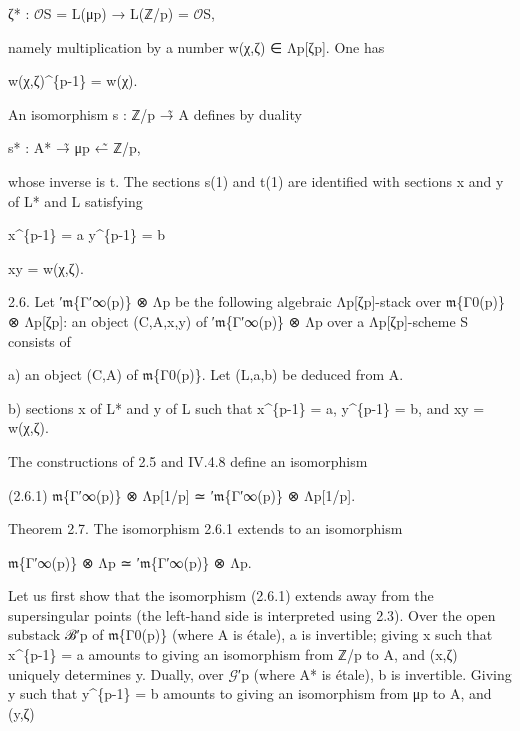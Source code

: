 \documentclass[11pt,a4paper]{article}
\begin{document}
ζ* : \ensuremath{\mathcal{O}}\textunderscore{}S = L(μ\textunderscore{}p) → L(ℤ/p) = \ensuremath{\mathcal{O}}\textunderscore{}S,

namely multiplication by a number w(χ,ζ) ∈ Λ\textunderscore{}p[ζ\textunderscore{}p]. One has

w(χ,ζ)\textasciicircum{}\{p-1\} = w(χ).

An isomorphism s : ℤ/p →̃ A defines by duality

s* : A* →̃ μ\textunderscore{}p ←̃ ℤ/p,

whose inverse is t. The sections s(1) and t(1) are identified with sections x and y of L* and L satisfying

x\textasciicircum{}\{p-1\} = a        y\textasciicircum{}\{p-1\} = b

xy = w(χ,ζ).

2.6. Let ′\ensuremath{\mathfrak{m}}\textunderscore{}\{Γ′\textunderscore{}∞(p)\} ⊗ Λ\textunderscore{}p be the following algebraic Λ\textunderscore{}p[ζ\textunderscore{}p]-stack over \ensuremath{\mathfrak{m}}\textunderscore{}\{Γ\textunderscore{}0(p)\} ⊗ Λ\textunderscore{}p[ζ\textunderscore{}p]: an object (C,A,x,y) of ′\ensuremath{\mathfrak{m}}\textunderscore{}\{Γ′\textunderscore{}∞(p)\} ⊗ Λ\textunderscore{}p over a Λ\textunderscore{}p[ζ\textunderscore{}p]-scheme S consists of

a) an object (C,A) of \ensuremath{\mathfrak{m}}\textunderscore{}\{Γ\textunderscore{}0(p)\}. Let (L,a,b) be deduced from A.

b) sections x of L* and y of L such that x\textasciicircum{}\{p-1\} = a, y\textasciicircum{}\{p-1\} = b, and xy = w(χ,ζ).

The constructions of 2.5 and IV.4.8 define an isomorphism

(2.6.1)        \ensuremath{\mathfrak{m}}\textunderscore{}\{Γ′\textunderscore{}∞(p)\} ⊗ Λ\textunderscore{}p[1/p] ≃ ′\ensuremath{\mathfrak{m}}\textunderscore{}\{Γ′\textunderscore{}∞(p)\} ⊗ Λ\textunderscore{}p[1/p].

Theorem 2.7. The isomorphism 2.6.1 extends to an isomorphism

\ensuremath{\mathfrak{m}}\textunderscore{}\{Γ′\textunderscore{}∞(p)\} ⊗ Λ\textunderscore{}p ≃ ′\ensuremath{\mathfrak{m}}\textunderscore{}\{Γ′\textunderscore{}∞(p)\} ⊗ Λ\textunderscore{}p.

Let us first show that the isomorphism (2.6.1) extends away from the supersingular points (the left-hand side is interpreted using 2.3). Over the open substack ℬ′\textunderscore{}p of \ensuremath{\mathfrak{m}}\textunderscore{}\{Γ\textunderscore{}0(p)\} (where A is étale), a is invertible; giving x such that x\textasciicircum{}\{p-1\} = a amounts to giving an isomorphism from ℤ/p to A, and (x,ζ) uniquely determines y. Dually, over \ensuremath{\mathcal{G}}′\textunderscore{}p (where A* is étale), b is invertible. Giving y such that y\textasciicircum{}\{p-1\} = b amounts to giving an isomorphism from μ\textunderscore{}p to A, and (y,ζ)
\end{document}
